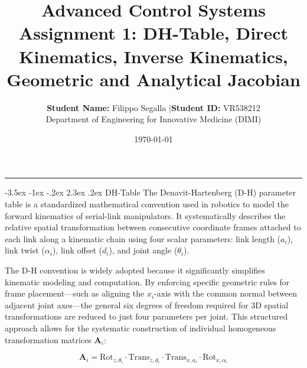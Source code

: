 \documentclass[11pt, a4paper]{article}
\title{
    \vspace{-1cm}
    \color{brandblue}\textbf{Advanced Control Systems}\\[0.3em]
    \Large\textbf{Assignment 1: DH-Table, Direct Kinematics, Inverse Kinematics, Geometric and Analytical Jacobian}
}
\author{\textbf{Student Name:} Filippo Segalla \quad|\quad \textbf{Student ID:} VR538212\\[0.2em]
\small  Department of Engineering for Innovative Medicine (DIMI) }
\date{\today}
\makeatletter
\renewcommand{\section}{\@startsection{section}{1}{\z@}%
    {-3.5ex \@plus -1ex \@minus -.2ex}%
    {2.3ex \@plus .2ex}%
    {\normalfont\Large\bfseries\color{brandblue}}}
\makeatother
\begin{document}
\maketitle
\thispagestyle{empty}

\begin{abstract}
\noindent 
\end{abstract}

\hrule
\vspace{1.5em}

\section{DH-Table}
The Denavit-Hartenberg (D-H) parameter table is a standardized mathematical convention used in robotics to model the forward kinematics of serial-link manipulators. It systematically describes the relative spatial transformation between consecutive coordinate frames attached to each link along a kinematic chain using four scalar parameters: link length ($a_i$), link twist ($\alpha_i$), link offset ($d_i$), and joint angle ($\theta_i$). 

The D-H convention is widely adopted because it significantly simplifies kinematic modeling and computation. By enforcing specific geometric rules for frame placement---such as aligning the $x_i$-axis with the common normal between adjacent joint axes---the general six degrees of freedom required for 3D spatial transformations are reduced to just four parameters per joint. This structured approach allows for the systematic construction of individual homogeneous transformation matrices $\mathbf{A}_i$:

\begin{equation}
    \mathbf{A}_i = \text{Rot}_{z, \theta_i} \cdot \text{Trans}_{z, d_i} \cdot \text{Trans}_{x, a_i} \cdot \text{Rot}_{x, \alpha_i}
\end{equation}
\end{document}
